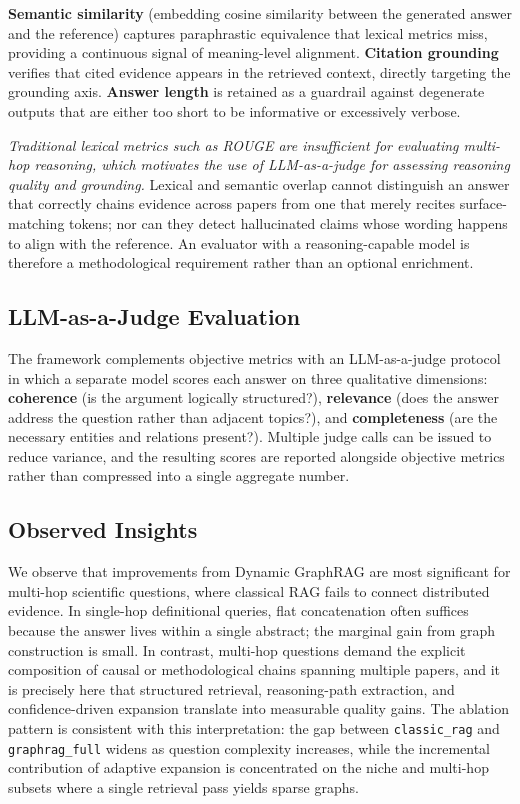 \documentclass[11pt,a4paper]{article}
\begin{document}
\textbf{Semantic similarity} (embedding cosine similarity between the
generated answer and the reference) captures paraphrastic equivalence that
lexical metrics miss, providing a continuous signal of meaning-level
alignment. \textbf{Citation grounding} verifies that cited evidence appears
in the retrieved context, directly targeting the grounding axis.
\textbf{Answer length} is retained as a guardrail against degenerate outputs
that are either too short to be informative or excessively verbose.

\emph{Traditional lexical metrics such as ROUGE are insufficient for
evaluating multi-hop reasoning, which motivates the use of LLM-as-a-judge for
assessing reasoning quality and grounding.} Lexical and semantic overlap
cannot distinguish an answer that correctly chains evidence across papers
from one that merely recites surface-matching tokens; nor can they detect
hallucinated claims whose wording happens to align with the reference. An
evaluator with a reasoning-capable model is therefore a methodological
requirement rather than an optional enrichment.

\subsection{LLM-as-a-Judge Evaluation}

The framework complements objective metrics with an LLM-as-a-judge
protocol~\cite{zheng2023judging} in which a separate model scores each answer
on three qualitative dimensions: \textbf{coherence} (is the argument
logically structured?), \textbf{relevance} (does the answer address the
question rather than adjacent topics?), and \textbf{completeness} (are the
necessary entities and relations present?). Multiple judge calls can be
issued to reduce variance, and the resulting scores are reported alongside
objective metrics rather than compressed into a single aggregate number.

\subsection{Observed Insights}

We observe that improvements from Dynamic GraphRAG are most significant for
multi-hop scientific questions, where classical RAG fails to connect
distributed evidence. In single-hop definitional queries, flat concatenation
often suffices because the answer lives within a single abstract; the
marginal gain from graph construction is small. In contrast, multi-hop
questions demand the explicit composition of causal or methodological chains
spanning multiple papers, and it is precisely here that structured retrieval,
reasoning-path extraction, and confidence-driven expansion translate into
measurable quality gains. The ablation pattern is consistent with this
interpretation: the gap between \texttt{classic\_rag} and
\texttt{graphrag\_full} widens as question complexity increases, while the
incremental contribution of adaptive expansion is concentrated on the niche
and multi-hop subsets where a single retrieval pass yields sparse graphs.
\end{document}
